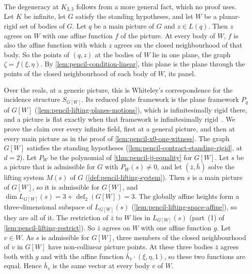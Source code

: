 \begin{remark}
  \label{rem:pencil-x0-flatness}
  The degeneracy at $K_{2,3}$ follows from a more general fact, which no
  proof uses. Let $K$ be infinite, let $G$ satisfy the standing
  hypotheses, and let $W$ be a planar-rigid set of bodies of $G$. Let $q$
  be a main picture of $G$ and $z \in L(q)$. Then $z$ agrees on $W$ with
  one affine function $f$ of the picture. At every body of $W$, $f$ is
  also the affine function with which $z$ agrees on the closed
  neighbourhood of that body. So the points of $(q, z)$ at the bodies of
  $W$ lie in one plane, the graph $\zeta = f(\xi, \eta)$. By
  \cref{lem:pencil-condition-linear}, this plane is the plane through the
  points of the closed neighbourhood of each body of $W$, its panel.

  Over the reals, at a generic picture, this is Whiteley's correspondence
  for the incidence structure $S_{G[W]}$. Its reduced plate framework is
  the plane framework $P_q$ of $G[W]$
  (\cref{lem:pencil-lifting-planes-motions}), which is infinitesimally
  rigid there, and a picture is flat exactly when that framework is
  infinitesimally rigid~\cite[Corollary~4.2(i)]{whiteley1984}. We prove
  the claim over every infinite field, first at a general picture, and
  then at every main picture as in the proof of
  \cref{lem:pencil-x0-one-witness}. The graph
  $G[W]$ satisfies the standing hypotheses
  (\cref{lem:pencil-contract-standing-rigid}, at $d = 2$). Let $P_W$ be
  the polynomial of \cref{thm:pencil-jj-equality} for $G[W]$. Let $s$ be
  a picture that is
  admissible for $G$ with $P_W(s) \neq 0$, and let $(\bar z, \bar h)$
  solve the lifting system $M(s)$ of $G$
  (\cref{def:pencil-lifting-system}). Then $s$ is a main picture of
  $G[W]$, so it is admissible for $G[W]$, and
  $\dim L_{G[W]}(s) = 3 + \operatorname{def}_2(G[W]) = 3$. The globally
  affine heights form a three-dimensional subspace of $L_{G[W]}(s)$
  (\cref{lem:pencil-lifting-space-affine}), so they are all of it. The
  restriction of $\bar z$ to $W$ lies in $L_{G[W]}(s)$ (part~(1) of
  \cref{lem:pencil-lifting-restrict}). So $\bar z$ agrees on $W$ with one
  affine function $g$. Let $v \in W$. As $s$ is admissible for $G[W]$,
  three members of the closed neighbourhood of $v$ in $G[W]$ have
  non-collinear picture points. At these three bodies $\bar z$ agrees
  both with $g$ and with the affine function
  $\bar h_v \cdot (\xi, \eta, 1)$, so these two functions are equal.
  Hence $\bar h_v$ is the same vector at every body $v$ of $W$.


\end{remark}
